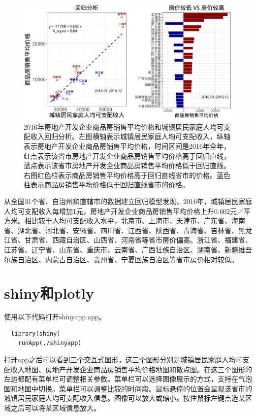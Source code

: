 \documentclass[11pt,a4paper,onecolumn]{article}
\begin{document}
\begin{figure}[H]
	\centering
	\includegraphics[width=400pt]{回归模型.pdf}
	\caption{2016年房地产开发企业商品房销售平均价格和城镇居民家庭人均可支配收入回归分析。左图横轴表示城镇居民家庭人均可支配收入，纵轴表示房地产开发企业商品房销售平均价格，时间区间是2016年全年，红点表示该省市房地产开发企业商品房销售平均价格高于回归直线，蓝点表示该省市房地产开发企业商品房销售平均价格低于回归直线。右图红色柱表示商品房销售平均价格高于回归直线省市的价格。蓝色柱表示商品房销售平均价格低于回归直线省市的价格。}
\end{figure}

从全国31个省、自治州和直辖市的数据建立回归模型发现，2016年，城镇居民家庭人均可支配收入每增加1元，房地产开发企业商品房销售平均价格上升0.602元／平方米。相比较于人均可支配收入水平，北京市、上海市、天津市、广东省、海南省、湖北省、河北省、安徽省、四川省、江西省、陕西省、青海省、吉林省、黑龙江省、甘肃省、西藏自治区、山西省、河南省等省市房价偏高。浙江省、福建省、江苏省、辽宁省、山东省、重庆市、云南省、广西壮族自治区、湖南省、新疆维吾尔族自治区、内蒙古自治区、贵州省、宁夏回族自治区等省市房价相对较低。

\section{shiny和plotly}

使用以下代码打开shinyapp.app。

\begin{lstlisting}
  library(shiny)
	runApp(./shinyapp)
\end{lstlisting}

打开app之后可以看到三个交互式图形，这三个图形分别是城镇居民家庭人均可支配收入地图、房地产开发企业商品房销售平均价格地图和散点图。在这三个图形的左边都配有菜单栏可调整相关参数。菜单栏可以选择图像展示的方式，支持在气泡图和地图中切换。菜单栏可以调整比较的时间段。鼠标悬停的位置会呈现该省市的城镇居民家庭人均可支配收入信息。图像可以放大或缩小。按住鼠标左键点选某区域之后可以将某区域信息放大。
\end{document}
